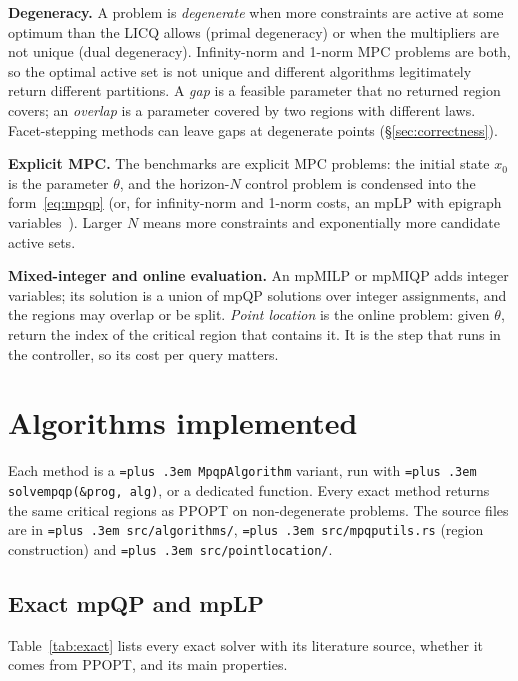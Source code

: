 \documentclass[10pt,a4paper]{article}
\newcommand{\ppopt}{PPOPT}
\newcommand{\code}[1]{{\let\_\bu\texttt{\spaceskip=\fontdimen2\font plus .3em #1}}}
\newcommand{\bu}{\textunderscore\hspace{0pt}}
\begin{document}
\textbf{Degeneracy.} A problem is \emph{degenerate} when more constraints are active at some optimum than the LICQ
allows (primal degeneracy) or when the multipliers are not unique (dual degeneracy). Infinity-norm and 1-norm MPC
problems are both, so the optimal active set is not unique and different algorithms legitimately return different
partitions. A \emph{gap} is a feasible parameter that no returned region covers; an \emph{overlap} is a parameter
covered by two regions with different laws. Facet-stepping methods can leave gaps at degenerate points (\S\ref{sec:correctness}).

\textbf{Explicit MPC.} The benchmarks are explicit MPC problems: the initial state $x_0$ is the parameter $\theta$,
and the horizon-$N$ control problem is condensed into the form~\eqref{eq:mpqp} (or, for infinity-norm and 1-norm costs,
an mpLP with epigraph variables~\cite{bemporad2002explicit}). Larger $N$ means more constraints and exponentially
more candidate active sets.

\textbf{Mixed-integer and online evaluation.} An mpMILP or mpMIQP adds integer variables; its solution is a union of
mpQP solutions over integer assignments, and the regions may overlap or be split. \emph{Point location} is the online
problem: given $\theta$, return the index of the critical region that contains it. It is the step that runs in the
controller, so its cost per query matters.

\section{Algorithms implemented}
\label{sec:algorithms}

Each method is a \code{MpqpAlgorithm} variant, run with \code{solve\_mpqp(\&prog, alg)}, or a dedicated function.
Every exact method returns the same critical regions as \ppopt{} on non-degenerate problems. The source files are in
\code{src/algorithms/}, \code{src/mpqp\_utils.rs} (region construction) and \code{src/point\_location/}.

\subsection{Exact mpQP and mpLP}

Table~\ref{tab:exact} lists every exact solver with its literature source, whether it comes from \ppopt{}, and its main properties.
\end{document}
